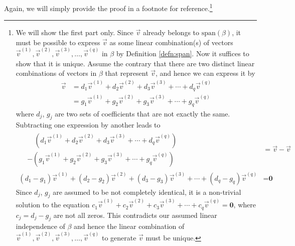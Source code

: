 Again, we will simply provide the proof in a footnote for reference.\footnote{We will show the first part only. Since $\vec{v}$ already belongs to $\text{span}(\mathcal{\beta})$, it must be possible to express $\vec{v}$ as some linear combination(s) of vectors $\vec{v}^{(1)}, \vec{v}^{(2)}, \vec{v}^{(3)}, \ldots, \vec{v}^{(q)}$ in $\mathcal{\beta}$ by Definition \ref{defn:span}. Now it suffices to show that it is unique. Assume the contrary that there are two distinct linear combinations of vectors in $\mathcal{\beta}$ that represent $\vec{v}$, and hence we can express it by
\begin{align*}
\vec{v} &= d_1\vec{v}^{(1)} + d_2\vec{v}^{(2)} + d_3\vec{v}^{(3)} + \cdots + d_q\vec{v}^{(q)} \\
&= g_1\vec{v}^{(1)} + g_2\vec{v}^{(2)} + g_3\vec{v}^{(3)} + \cdots + g_q\vec{v}^{(q)}
\end{align*}
where $d_j$, $g_j$ are two sets of coefficients that are not exactly the same. Subtracting one expression by another leads to
\begin{align*}
\begin{aligned}
&\quad (d_1\vec{v}^{(1)} + d_2\vec{v}^{(2)} + d_3\vec{v}^{(3)} + \cdots + d_q\vec{v}^{(q)}) \\
& -(g_1\vec{v}^{(1)} + g_2\vec{v}^{(2)} + g_3\vec{v}^{(3)} + \cdots + g_q\vec{v}^{(q)})
\end{aligned}
&= \vec{v} - \vec{v} \\
(d_1 - g_1)\vec{v}^{(1)} + (d_2 - g_2)\vec{v}^{(2)} + (d_3 - g_3)\vec{v}^{(3)} + \cdots + (d_q - g_q)\vec{v}^{(q)} &= \textbf{0} 
\end{align*}
Since $d_j$, $g_j$ are assumed to be not completely identical, it is a non-trivial solution to the equation $c_1\vec{v}^{(1)} + c_2\vec{v}^{(2)} + c_3\vec{v}^{(3)} + \cdots + c_q\vec{v}^{(q)} = \textbf{0}$, where $c_j = d_j - g_j$ are not all zeros. This contradicts our assumed linear independence of $\mathcal{\beta}$ and hence the linear combination of $\vec{v}^{(1)}, \vec{v}^{(2)}, \vec{v}^{(3)}, \ldots, \vec{v}^{(q)}$ to generate $\vec{v}$ must be unique.}
